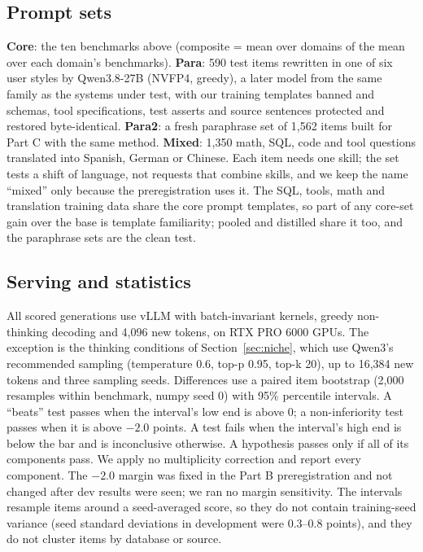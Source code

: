 \documentclass[11pt]{article}
\begin{document}
\subsection{Prompt sets}
\textbf{Core}: the ten benchmarks above (composite = mean over domains of the mean over each domain's benchmarks).
\textbf{Para}: 590 test items rewritten in one of six user styles by Qwen3.8-27B (NVFP4, greedy), a later model
from the same family as the systems under test, with our training templates
banned and schemas, tool specifications, test asserts and source sentences protected and restored byte-identical.
\textbf{Para2}: a fresh paraphrase set of 1,562 items built for Part C with the same method. \textbf{Mixed}: 1,350
math, SQL, code and tool questions translated into Spanish, German or Chinese. Each item needs one skill; the set
tests a shift of language, not requests that combine skills, and we keep the name ``mixed'' only because the
preregistration uses it. The SQL, tools, math and translation training
data share the core prompt templates, so part of any core-set gain over the base is template familiarity; pooled and
distilled share it too, and the paraphrase sets are the clean test.

\subsection{Serving and statistics}
All scored generations use vLLM with batch-invariant kernels, greedy non-thinking decoding and 4,096 new tokens,
on RTX PRO 6000 GPUs. The exception is the thinking conditions of Section~\ref{sec:niche}, which use Qwen3's
recommended sampling (temperature 0.6, top-p 0.95, top-k 20), up to 16,384 new tokens and three sampling seeds. Differences use a paired item bootstrap (2,000 resamples
within benchmark, numpy seed 0) with 95\% percentile intervals. A ``beats'' test passes when the interval's low end
is above 0; a non-inferiority test passes when it is above $-2.0$ points. A test fails when the interval's high end
is below the bar and is inconclusive otherwise. A hypothesis passes only if all of its components pass. We apply no
multiplicity correction and report every component. The $-2.0$ margin was fixed in the Part B preregistration and
not changed after dev results were seen; we ran no margin sensitivity. The intervals resample items around a
seed-averaged score, so they do not contain training-seed variance (seed standard deviations in development were
0.3--0.8 points), and they do not cluster items by database or source.
\end{document}
